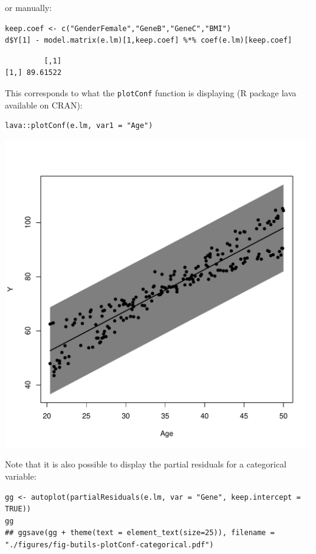\documentclass[12pt]{article}
\begin{document}
or manually: 
\lstset{language=r,label= ,caption= ,captionpos=b,numbers=none}
\begin{lstlisting}
keep.coef <- c("GenderFemale","GeneB","GeneC","BMI")
d$Y[1] - model.matrix(e.lm)[1,keep.coef] %*% coef(e.lm)[keep.coef]
\end{lstlisting}

\begin{verbatim}
         [,1]
[1,] 89.61522
\end{verbatim}

This corresponds to what the \texttt{plotConf} function is displaying (R
package lava available on CRAN):
\lstset{language=r,label= ,caption= ,captionpos=b,numbers=none}
\begin{lstlisting}
lava::plotConf(e.lm, var1 = "Age")
\end{lstlisting}

\begin{center}
\includegraphics[width=.9\linewidth]{./figures/fig-lava-plotConf.pdf}
\end{center}

Note that it is also possible to display the partial residuals for a
categorical variable:
\lstset{language=r,label= ,caption= ,captionpos=b,numbers=none}
\begin{lstlisting}
gg <- autoplot(partialResiduals(e.lm, var = "Gene", keep.intercept = TRUE))
gg
## ggsave(gg + theme(text = element_text(size=25)), filename = "./figures/fig-butils-plotConf-categorical.pdf")
\end{lstlisting}
\end{document}
